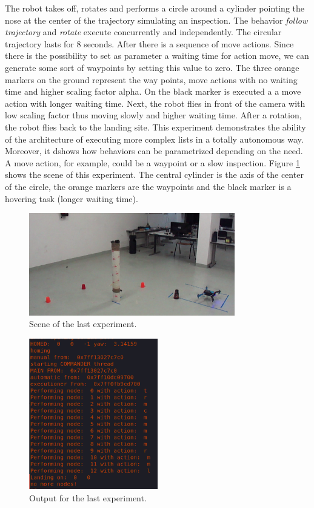 The robot takes off, rotates and performs a circle around a cylinder pointing the nose at the center of the trajectory simulating an inspection. The behavior \textit{follow trajectory} and \textit{rotate} execute concurrently and independently. The circular trajectory lasts for 8 seconds. After there is a sequence of move actions. Since there is the possibility to set as parameter a waiting time for action move, we can generate some sort of waypoints by setting this value to zero. The three orange markers on the ground represent the way points, move actions with no waiting time and higher scaling factor alpha. On the black marker is executed a a move action with longer waiting time. Next, the robot flies in front of the camera with low scaling factor thus moving slowly and higher waiting time. After a rotation, the robot flies back to the landing site. This experiment demonstrates the ability of the architecture of executing more complex lists in a totally autonomous way. Moreover, it dshows how behaviors can be parametrized depending on the need. A move action, for example, could be a waypoint or a slow inspection. Figure \ref{figure:circle} shows the scene of this experiment. The central cylinder is the axis of the center of the circle, the orange markers are the waypoints and the black marker is a hovering task (longer waiting time).

\begin{figure}[h]
\centering
 \includegraphics[width=0.8\textwidth]{circle.png}
 \caption{Scene of the last experiment.}
 \label{figure:circle}
\end{figure}


\begin{figure}[h]
\centering
 \includegraphics[width=0.5\textwidth]{snippet.png}
 \caption{Output for the last experiment.}
 \label{figure:snip}
\end{figure}













